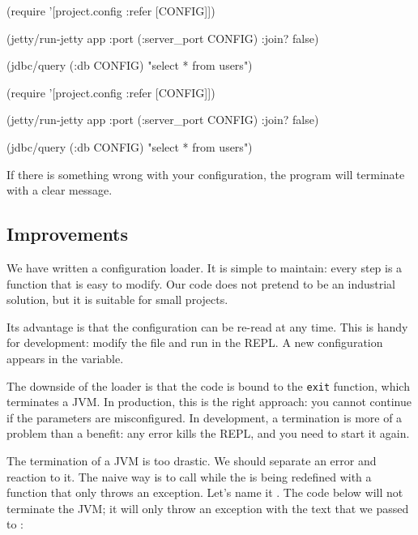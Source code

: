 
\ifnarrow

\begin{clojure}
(require
  '[project.config :refer [CONFIG]])

(jetty/run-jetty app
  {:port (:server_port CONFIG)
   :join? false})

(jdbc/query (:db CONFIG)
  "select * from users")
\end{clojure}

\else

\begin{clojure}
(require '[project.config :refer [CONFIG]])

(jetty/run-jetty app {:port (:server_port CONFIG)
                      :join? false})

(jdbc/query (:db CONFIG) "select * from users")
\end{clojure}

\fi

If there is something wrong with your configuration, the program will terminate with a clear message.

\subsection{Improvements}

We have written a configuration loader. It is simple to maintain: every step is a function that is easy to modify. Our code does not pretend to be an industrial solution, but it is suitable for small projects.

Its advantage is that the configuration can be re-read at any time. This is handy for development: modify the file and run  in the REPL. A new configuration appears in the  variable.


The downside of the loader is that the code is bound to the \verb|exit| function, which terminates a JVM. In production, this is the right approach: you cannot continue if the parameters are misconfigured. In development, a termination is more of a problem than a benefit: any error kills the REPL, and you need to start it again.

The termination of a JVM is too drastic. We should separate an error and reaction to it. The naive way is to call  while the  is being redefined with a function that only throws an exception. Let's name it . The code below will not terminate the JVM; it will only throw an exception with the text that we passed to :

